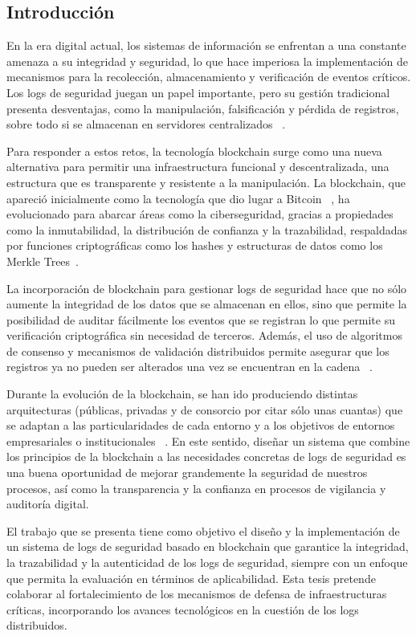 
\subsection{Introducción}
En la era digital actual, los sistemas de información se enfrentan a una constante amenaza a su integridad y seguridad, lo que hace imperiosa la implementación de mecanismos para la recolección, almacenamiento y verificación de eventos críticos. Los logs de seguridad juegan un papel importante, pero su gestión tradicional presenta desventajas, como la manipulación, falsificación y pérdida de registros, sobre todo si se almacenan en servidores centralizados ~\cite{birk2011forensics}.

Para responder a estos retos, la tecnología blockchain surge como una nueva alternativa para permitir una infraestructura funcional y descentralizada, una estructura que es transparente y resistente a la manipulación. La blockchain, que apareció inicialmente como la tecnología que dio lugar a Bitcoin ~\cite{nakamoto2008bitcoin}, ha evolucionado para abarcar áreas como la ciberseguridad, gracias a propiedades como la inmutabilidad, la distribución de confianza y la trazabilidad, respaldadas por funciones criptográficas como los hashes y estructuras de datos como los Merkle Trees~\cite{crosby2016blockchain,stallings2017crypto}.

La incorporación de blockchain para gestionar logs de seguridad hace que no sólo aumente la integridad de los datos que se almacenan en ellos, sino que permite la posibilidad de auditar fácilmente los eventos que se registran lo que permite su verificación criptográfica sin necesidad de terceros. Además, el uso de algoritmos de consenso y mecanismos de validación distribuidos permite asegurar que los registros ya no pueden ser alterados una vez se encuentran en la cadena ~\cite{zheng2017overview}.

Durante la evolución de la blockchain, se han ido produciendo distintas arquitecturas (públicas, privadas y de consorcio por citar sólo unas cuantas) que se adaptan a las particularidades de cada entorno y a los objetivos de entornos empresariales o institucionales ~\cite{christidis2016blockchains}. En este sentido, diseñar un sistema que combine los principios de la blockchain a las necesidades concretas de logs de seguridad es una buena oportunidad de mejorar grandemente la seguridad de nuestros procesos, así como la transparencia y la confianza en procesos de vigilancia y auditoría digital.

El trabajo que se presenta tiene como objetivo el diseño y la implementación de un sistema de logs de seguridad basado en blockchain que garantice la integridad, la trazabilidad y la autenticidad de los logs de seguridad, siempre con un enfoque que permita la evaluación en términos de aplicabilidad. Esta tesis pretende colaborar al fortalecimiento de los mecanismos de defensa de infraestructuras críticas, incorporando los avances tecnológicos en la cuestión de los logs distribuidos.



